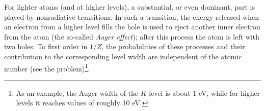 For lighter atoms (and at higher levels), a substantial, or even dominant, part is played
by nonradiative transitions. In such a transition, the energy released when an electron from a higher level fills the hole is used to eject another inner electron from the atom (the so-called \emph{Auger effect}); after this process the atom is left with two holes. To first order in $1/Z$, the probabilities of these processes and their contribution to the corresponding level width are independent of the atomic number (see the problem)\footnote{As an example, the Auger width of the $K$ level is about 1 eV, while for higher levels it reaches values of roughly 10 eV.}.
